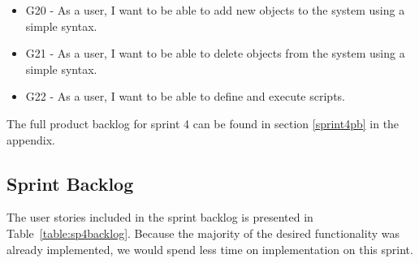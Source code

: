 \begin{itemize}
\item G20 - As a user, I want to be able to add new objects to the system using a simple syntax.
\item G21 - As a user, I want to be able to delete objects from the system using a simple syntax.
\item G22 - As a user, I want to be able to define and execute scripts.
\end{itemize}

The full product backlog for sprint 4 can be found in section \ref{sprint4pb} in the appendix.

\subsection{Sprint Backlog}
The user stories included in the sprint backlog is presented in Table~\ref{table:sp4backlog}. Because the majority of the desired functionality was already implemented, we would spend less time on implementation on this sprint.

